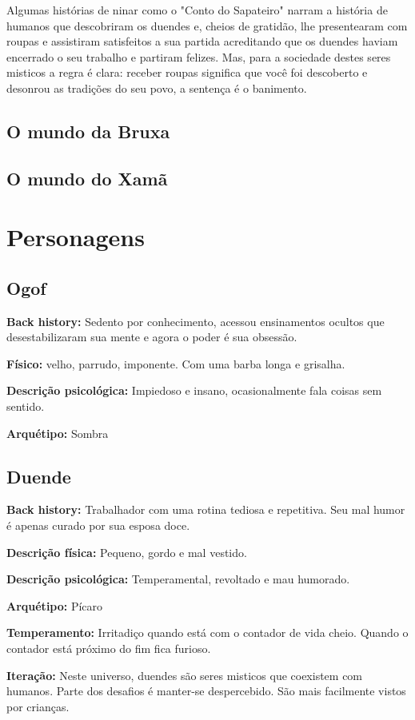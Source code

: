 Algumas histórias de ninar como o "Conto do Sapateiro" narram a história de humanos que descobriram os duendes e, cheios de gratidão, lhe presentearam com roupas e assistiram satisfeitos a sua partida acreditando que os duendes haviam encerrado o seu trabalho e partiram felizes. Mas, para a sociedade destes seres misticos a regra é clara: receber roupas significa que você foi descoberto e desonrou as tradições do seu povo, a sentença é o banimento. 

\subsection{O mundo da Bruxa}
\subsection{O mundo do Xamã}


\section{Personagens}
\subsection{Ogof}
\textbf{Back history: }Sedento por conhecimento, acessou ensinamentos ocultos que desestabilizaram sua mente e agora o poder é sua obsessão.

\textbf{Físico:} velho, parrudo, imponente. Com uma barba longa e grisalha.

\textbf{Descrição psicológica:} Impiedoso e insano, ocasionalmente fala coisas sem sentido.

\textbf{Arquétipo:} Sombra

\subsection{Duende}
\textbf{Back history:} Trabalhador com uma rotina tediosa e repetitiva. Seu mal humor é apenas curado por sua esposa doce.

\textbf{Descrição física:} Pequeno, gordo e mal vestido.

\textbf{Descrição psicológica:} Temperamental, revoltado e mau humorado.

\textbf{Arquétipo:} Pícaro

\textbf{Temperamento:} Irritadiço quando está com o contador de vida cheio. Quando o contador está próximo do fim fica furioso.

\textbf{Iteração: } Neste universo, duendes são seres misticos que coexistem com humanos. Parte dos desafios é manter-se despercebido. São mais facilmente vistos por crianças.

